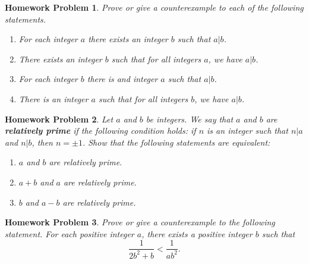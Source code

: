 \documentclass{article}
\newtheorem{hw}{Homework Problem}
\begin{document}
	\underline{\hspace{5in}}


	\begin{hw}
		Prove or give a counterexample to each of the following statements.
		\begin{enumerate}
			\item[(i)] For each integer $a$ there exists an integer $b$ such that $a|b$.
			\item[(ii)] There exists an integer $b$ such that for all integers $a$, we have $a|b$.
			\item[(iii)] For each integer $b$ there is and integer $a$ such that $a|b$.
			\item[(iv)] There is an integer $a$ such that for all integers $b$, we have $a|b$.
		\end{enumerate}
	\end{hw}
	\begin{hw}
		Let $a$ and $b$ be integers. We say that $a$ and $b$ are \textbf{relatively prime} if the following condition holds: if $n$ is an integer such that $n|a$ and $n|b$, then $n=\pm1$.
		Show that the following statements are equivalent:
		\begin{enumerate}
			\item[(i)] $a$ and $b$ are relatively prime.
			\item[(ii)] $a+b$ and $a$ are relatively prime.
			\item[(iii)] $b$ and $a-b$ are relatively prime.
		\end{enumerate}
	\end{hw}
	\begin{hw}
		Prove or give a counterexample to the following statement. For each positive integer $a$, there exists a positive integer $b$ such that $$\frac{1}{2b^2+b} < \frac{1}{ab^2}.$$
	\end{hw}

	\underline{\hspace{5in}}

\end{document}
